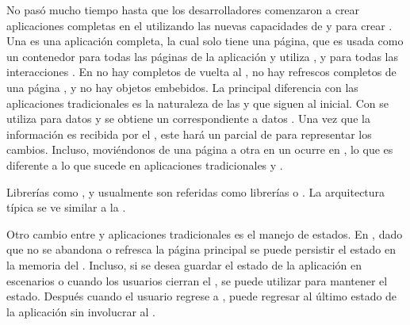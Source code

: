 No pasó mucho tiempo hasta que los desarrolladores comenzaron a crear aplicaciones completas en el \browserINT utilizando las nuevas capacidades de \javaScriptNAME y \htmlfive para crear \singlePageAppINT. Una \spa es una aplicación \webINT completa, la cual solo tiene una página, que es usada como un contenedor para todas las páginas \webINT de la aplicación y utiliza \javaScriptNAME, \htmlfive y \cssNAME para todas las interacciones \frontEndsAS. En \spas no hay \posts completos de vuelta al \serverAS, no hay refrescos completos de una página \webINT, y no hay objetos embebidos. La principal diferencia con las aplicaciones \webINT tradicionales es la naturaleza de las \requests y \responsesINT que siguen al \requestINT \httpNAME inicial. Con \spa se utiliza \ajaxNAME para \requestINT datos y se obtiene un \responsesINT correspondiente a datos \jsonNAME. Una vez que la información es recibida por el \clientAS, este hará un \renderCPT parcial de \htmlNAME para representar los cambios. Incluso, moviéndonos de una página a otra en un \spa ocurre en \clientSideAS, lo que es diferente a lo que sucede en aplicaciones tradicionales y \ria.

Librerías como \backbonejsNAME \emberjsNAME, y \angularjsNAME usualmente son referidas como librerías \clientSideAS \mvcAS o \mvvmAS. La arquitectura típica \clientSideAS \mvcAS se ve similar a la . 




Otro cambio entre \spa y aplicaciones \webINT tradicionales es el manejo de estados. En \spa, dado que no se abandona o refresca la página \webINT principal se puede persistir el estado en la memoria del \browserINT. Incluso, si se desea guardar el estado de la aplicación en escenarios \offline o cuando los usuarios cierran el \browserINT, se puede utilizar \htmlfive \storage para mantener el estado. Después cuando el usuario regrese a \online, puede regresar al último estado de la aplicación sin involucrar al \serverAS.

